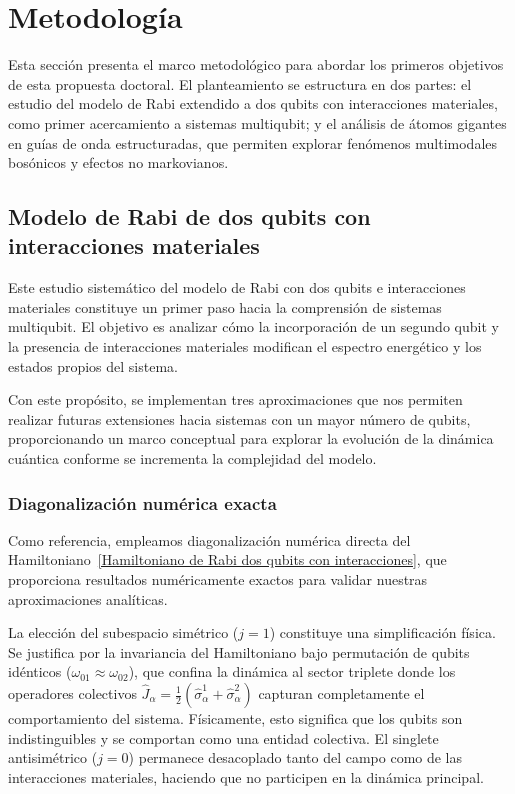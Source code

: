 \documentclass[onecolumn,notitlepage,letterpaper,aps,pra,12pt]{article}
\numberwithin{equation}{section}
\begin{document}
\section{Metodología}

Esta sección presenta el marco metodológico para abordar los primeros objetivos de esta propuesta doctoral. El planteamiento se estructura en dos partes:  el estudio del modelo de Rabi extendido a dos qubits con interacciones materiales, como primer acercamiento a sistemas multiqubit; y el análisis de átomos gigantes en guías de onda estructuradas, que permiten explorar fenómenos multimodales bosónicos y efectos no markovianos. 

\subsection{Modelo de Rabi de dos qubits con interacciones materiales}

Este estudio sistemático del modelo de Rabi con dos qubits e interacciones materiales constituye un primer paso hacia la comprensión de sistemas multiqubit. El objetivo es analizar cómo la incorporación de un segundo qubit y la presencia de interacciones materiales modifican el espectro energético y los estados propios del sistema.

Con este propósito, se implementan tres aproximaciones  que nos permiten realizar futuras extensiones hacia sistemas con un mayor número de qubits, proporcionando un marco conceptual para explorar la evolución de la dinámica cuántica conforme se incrementa la complejidad del modelo.


\subsubsection{Diagonalización numérica exacta}

Como referencia, empleamos diagonalización numérica directa del Hamiltoniano~\eqref{Hamiltoniano de Rabi dos qubits con interacciones}, que proporciona resultados numéricamente exactos para validar nuestras aproximaciones analíticas. 

La elección del subespacio simétrico ($j=1$) constituye una simplificación física. Se justifica por la invariancia del Hamiltoniano bajo permutación de qubits idénticos ($\omega_{01} \approx \omega_{02}$), que confina la dinámica al sector triplete donde los operadores colectivos $\hat{J}_{\alpha} = \frac{1}{2}(\hat{\sigma}_{\alpha}^{1} + \hat{\sigma}_{\alpha}^{2})$ capturan completamente el comportamiento del sistema. Físicamente, esto significa que los qubits son indistinguibles y se comportan como una entidad colectiva. El singlete antisimétrico ($j=0$) permanece desacoplado tanto del campo como de las interacciones materiales, haciendo que no participen en la dinámica principal.
\end{document}
